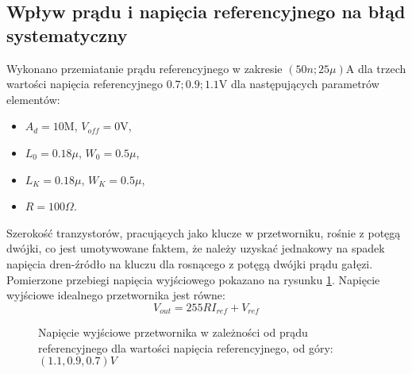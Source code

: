 \documentclass[10pt,a4paper,twoside]{report}
\theoremstyle{definition}
\theoremstyle{definition}
\theoremstyle{definition}
\theoremstyle{definition}
\theoremstyle{definition}
\begin{document}
{{	\subsection{Wpływ prądu i napięcia referencyjnego na błąd systematyczny}
	{	Wykonano przemiatanie prądu referencyjnego w zakresie $(50n; 25\mu)$A dla trzech wartości napięcia referencyjnego ${0.7;0.9;1.1}$V dla następujących parametrów elementów:
	\begin{itemize}
	\item $A_d = 10$M, $V_{off} = 0$V,
	\item $L_0 = 0.18\mu$, $W_0 = 0.5\mu$,
	\item $L_K = 0.18\mu$, $W_K = 0.5\mu$,
	\item $R = 100 \Omega$.
	\end{itemize}
	Szerokość tranzystorów, pracujących jako klucze w przetworniku, rośnie z potęgą dwójki, co jest umotywowane faktem, że należy uzyskać jednakowy na spadek napięcia dren-źródło na kluczu dla rosnącego z potęgą dwójki prądu gałęzi. Pomierzone przebiegi napięcia wyjściowego pokazano na rysunku \ref{i_u_depend}. Napięcie wyjściowe idealnego przetwornika jest równe:
		\begin{equation}
			V_{out} = 255R I_{ref} + V_{ref}
		\end{equation}
\begin{figure}[!ht]
	\centering
	\caption{Napięcie wyjściowe przetwornika w zależności od prądu referencyjnego dla wartości napięcia referencyjnego, od góry: $(1.1,0.9,0.7)V$}
	\label{i_u_depend}
\end{figure}

}}}
\end{document}
